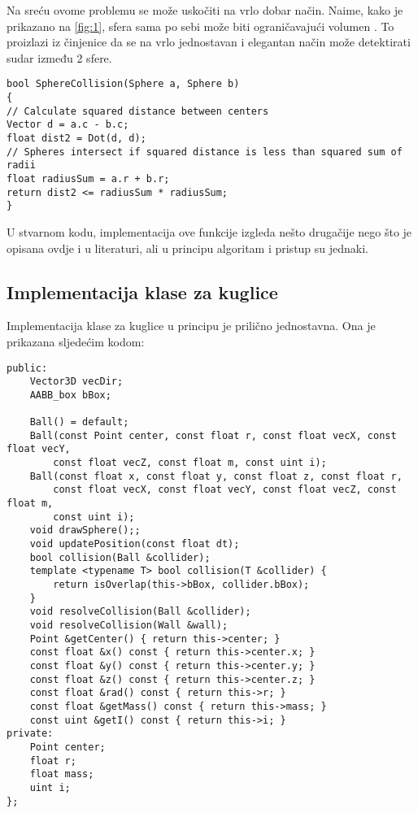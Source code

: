 Na sreću ovome problemu se može uskočiti na vrlo dobar način. Naime, kako je prikazano na \ref{fig:1}, sfera sama po sebi može biti ograničavajući volumen \cite{1}. To proizlazi iz činjenice da se na vrlo jednostavan i elegantan način može detektirati sudar između 2 sfere. 

\begin{lstlisting}[style = {myC++},label={code:6-1}, caption = {Detekcija sudara između 2 sfere\cite{1}}]
bool SphereCollision(Sphere a, Sphere b)
{
// Calculate squared distance between centers
Vector d = a.c - b.c;
float dist2 = Dot(d, d);
// Spheres intersect if squared distance is less than squared sum of radii
float radiusSum = a.r + b.r;
return dist2 <= radiusSum * radiusSum;
}
\end{lstlisting}
U stvarnom kodu, implementacija ove funkcije izgleda nešto drugačije nego što je opisana ovdje i u literaturi, ali u principu algoritam i pristup su jednaki.
\newpage
\subsection{Implementacija klase za kuglice}

Implementacija klase za kuglice u principu je prilično jednostavna. Ona je prikazana sljedećim kodom:

\begin{lstlisting}[style = {myC++},label={code:7}, caption = {Implementacija klase za kuglice}]
public:
	Vector3D vecDir;
	AABB_box bBox;
	
	Ball() = default;
	Ball(const Point center, const float r, const float vecX, const float vecY,
		const float vecZ, const float m, const uint i);
	Ball(const float x, const float y, const float z, const float r,
		const float vecX, const float vecY, const float vecZ, const float m,
		const uint i);	
	void drawSphere();;
	void updatePosition(const float dt);
	bool collision(Ball &collider);
	template <typename T> bool collision(T &collider) {
		return isOverlap(this->bBox, collider.bBox);
	}
	void resolveCollision(Ball &collider);
	void resolveCollision(Wall &wall);
	Point &getCenter() { return this->center; }
	const float &x() const { return this->center.x; }
	const float &y() const { return this->center.y; }
	const float &z() const { return this->center.z; }
	const float &rad() const { return this->r; }
	const float &getMass() const { return this->mass; }
	const uint &getI() const { return this->i; }
private:
	Point center;
	float r;
	float mass;
	uint i;
};

\end{lstlisting}

